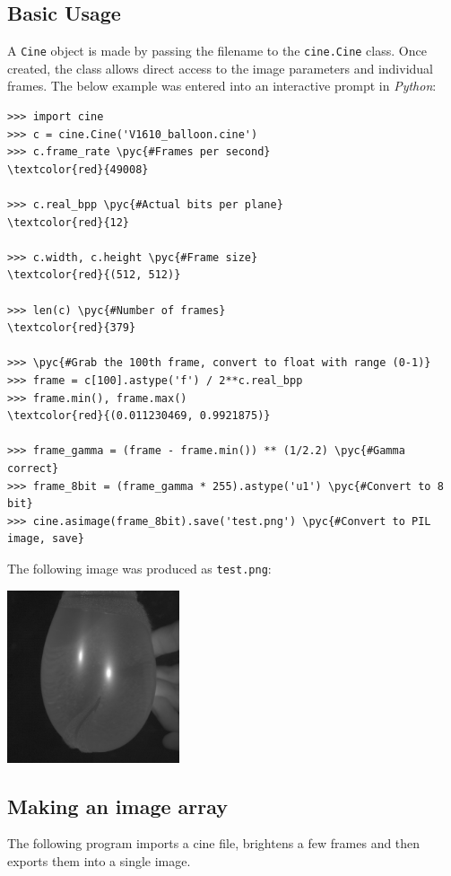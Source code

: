 \documentclass[11pt]{amsart}
\newcommand{\pyc}[1]{\textcolor{comment_color}{#1}}
\begin{document}
\vfill \pagebreak
\subsection{Basic Usage}
A \texttt{Cine} object is made by passing the filename to the \texttt{cine.Cine} class.
Once created, the class allows direct access to the image parameters and individual frames.
The below example was entered into an interactive prompt in \emph{Python}:

\begin{Verbatim}[commandchars=\\\{\}]
>>> import cine
>>> c = cine.Cine('V1610_balloon.cine')
>>> c.frame_rate \pyc{#Frames per second}
\textcolor{red}{49008}

>>> c.real_bpp \pyc{#Actual bits per plane}
\textcolor{red}{12}

>>> c.width, c.height \pyc{#Frame size}
\textcolor{red}{(512, 512)}

>>> len(c) \pyc{#Number of frames}
\textcolor{red}{379}

>>> \pyc{#Grab the 100th frame, convert to float with range (0-1)}
>>> frame = c[100].astype('f') / 2**c.real_bpp 
>>> frame.min(), frame.max()
\textcolor{red}{(0.011230469, 0.9921875)}

>>> frame_gamma = (frame - frame.min()) ** (1/2.2) \pyc{#Gamma correct}
>>> frame_8bit = (frame_gamma * 255).astype('u1') \pyc{#Convert to 8 bit}
>>> cine.asimage(frame_8bit).save('test.png') \pyc{#Convert to PIL image, save}
\end{Verbatim}

The following image was produced as \texttt{test.png}:

\includegraphics[width=2in]{figures/command_line_test.png}

\vfill \pagebreak
\subsection{Making an image array}
The following program imports a cine file, brightens a few frames and then exports them into a single image.
\end{document}
